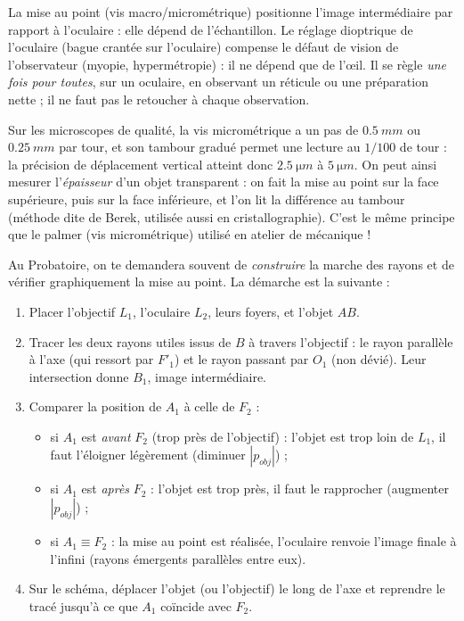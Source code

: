 \documentclass[11pt]{article}
\newcommand{\cle}[1]{{\popxbold\color{popdark}#1}}
\newcounter{popsec}
\newcounter{popsub}
\newcommand{\courssub}[1]{%
  \stepcounter{popsub}%
  \par\vspace{9pt}\noindent{\popxbold\fontsize{11.5}{13}\selectfont\color{popink}{\color{poporange}\thepopsec.\thepopsub}\hspace{6pt}#1}\par\nopagebreak\vspace{4pt}
}
\begin{document}
\begin{attention}
La \cle{mise au point} (vis macro/micrométrique) positionne l'image intermédiaire par rapport à l'oculaire : elle dépend de l'échantillon. Le \cle{réglage dioptrique} de l'oculaire (bague crantée sur l'oculaire) compense le défaut de vision de l'observateur (myopie, hypermétropie) : il ne dépend que de l'œil. Il se règle \emph{une fois pour toutes}, sur un oculaire, en observant un réticule ou une préparation nette ; il ne faut pas le retoucher à chaque observation.
\end{attention}

\begin{savaistu}
Sur les microscopes de qualité, la vis micrométrique a un pas de $\SI{0,5}{mm}$ ou $\SI{0,25}{mm}$ par tour, et son tambour gradué permet une lecture au $1/100$ de tour : la précision de déplacement vertical atteint donc $\SI{2,5}{\micro m}$ à $\SI{5}{\micro m}$. On peut ainsi mesurer l'\emph{épaisseur} d'un objet transparent : on fait la mise au point sur la face supérieure, puis sur la face inférieure, et l'on lit la différence au tambour (méthode dite de Berek, utilisée aussi en cristallographie). C'est le même principe que le palmer (vis micrométrique) utilisé en atelier de mécanique !
\end{savaistu}

\courssub{Mise au point sur un schéma de principe}

Au Probatoire, on te demandera souvent de \emph{construire} la marche des rayons et de vérifier graphiquement la mise au point. La démarche est la suivante :

\begin{methode}
\begin{enumerate}
\item Placer l'objectif $L_1$, l'oculaire $L_2$, leurs foyers, et l'objet $AB$.
\item Tracer les deux rayons utiles issus de $B$ à travers l'objectif : le rayon parallèle à l'axe (qui ressort par $F'_1$) et le rayon passant par $O_1$ (non dévié). Leur intersection donne $B_1$, image intermédiaire.
\item Comparer la position de $A_1$ à celle de $F_2$ :
\begin{itemize}
\item si $A_1$ est \emph{avant} $F_2$ (trop près de l'objectif) : l'objet est trop loin de $L_1$, il faut l'éloigner légèrement (diminuer $|p_{obj}|$) ;
\item si $A_1$ est \emph{après} $F_2$ : l'objet est trop près, il faut le rapprocher (augmenter $|p_{obj}|$) ;
\item si $A_1 \equiv F_2$ : la mise au point est réalisée, l'oculaire renvoie l'image finale à l'infini (rayons émergents parallèles entre eux).
\end{itemize}
\item Sur le schéma, déplacer l'objet (ou l'objectif) le long de l'axe et reprendre le tracé jusqu'à ce que $A_1$ coïncide avec $F_2$.
\end{enumerate}
\end{methode}
\end{document}
